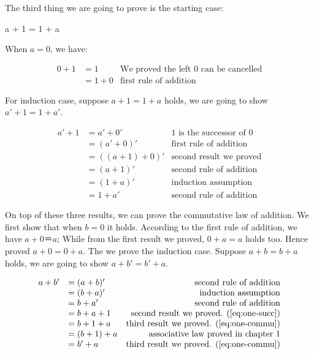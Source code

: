 \documentclass[UTF8]{article}
\begin{document}
The third thing we are going to prove is the starting case:

\be
a + 1 = 1 + a
\label{eq:one-commu}
\ee

When $a = 0$, we have:

\[
\begin{array}{rlr}
0 + 1 & = 1 & \text{We proved the left 0 can be cancelled} \\
      & = 1 + 0 & \text{first rule of addition}
\end{array}
\]

For induction case, suppose $a + 1 = 1 + a$ holds, we are going to show $a' + 1 = 1 + a'$.

\[
\begin{array}{rlr}
a' + 1 & = a' + 0' & \text{1 is the successor of 0} \\
       & = (a' + 0)' & \text{first rule of addition} \\
       & = ((a + 1) + 0)' & \text{second result we proved} \\
       & = (a + 1)' & \text{second rule of addition} \\
       & = (1 + a)' & \text{induction assumption} \\
       & = 1 + a' & \text{second rule of addition}
\end{array}
\]

On top of these three results, we can prove the commutative law of addition. We first show that when $b = 0$ it holds. According to the first rule of addition, we have $a + 0 ＝ a$; While from the first result we proved, $0 + a = a$ holds too. Hence proved $a + 0 = 0 + a$. The we prove the induction case. Suppose $a + b = b + a$ holds, we are going to show $a + b' = b' + a$.

\[
\begin{array}{rlr}
a + b' & = (a + b)' & \text{second rule of addition} \\
       & = (b + a)' & \text{induction assumption} \\
       & = b + a' & \text{second rule of addition} \\
       & = b + a + 1 & \text{second result we proved. (\ref{eq:one-succ})} \\
       & = b + 1 + a & \text{third result we proved. (\ref{eq:one-commu})} \\
       & = (b + 1) + a & \text{associative law proved in chapter 1} \\
       & = b' + a & \text{third result we proved. (\ref{eq:one-commu})}
\end{array}
\]
\end{document}

